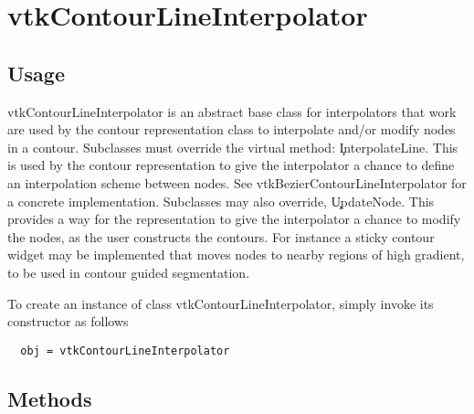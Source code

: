 \section{vtkContourLineInterpolator}

\subsection{Usage}

 vtkContourLineInterpolator is an abstract base class for interpolators
 that work are used by the contour representation class to interpolate 
 and/or modify nodes in a contour. Subclasses must override the virtual
 method: \c InterpolateLine. This is used by the contour representation 
 to give the interpolator a chance to define an interpolation scheme
 between nodes. See vtkBezierContourLineInterpolator for a concrete 
 implementation. Subclasses may also override, \c UpdateNode. This provides
 a way for the representation to give the interpolator a chance to modify
 the nodes, as the user constructs the contours. For instance a sticky
 contour widget may be implemented that moves nodes to nearby regions of
 high gradient, to be used in contour guided segmentation.


To create an instance of class vtkContourLineInterpolator, simply
invoke its constructor as follows
\begin{verbatim}
  obj = vtkContourLineInterpolator
\end{verbatim}
\subsection{Methods}

